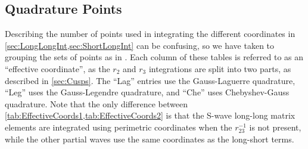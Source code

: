 \documentclass[Dissertation.tex]{subfiles}
\begin{document}
%
%
%


\subsection{Quadrature Points}
\label{sec:QuadraturePoints}


Describing the number of points used in integrating the different coordinates 
in \cref{sec:LongLongInt,sec:ShortLongInt} can be confusing, so we have taken 
to grouping the sets of points as in
. Each column of these tables 
is referred to as an ``effective coordinate'', as the $r_2$ and $r_3$ 
integrations are split into two parts, as described in \cref{sec:Cusps}.
The ``Lag'' entries use the Gauss-Laguerre quadrature, ``Leg'' uses the
Gauss-Legendre quadrature, and ``Che'' uses Chebyshev-Gauss quadrature. Note
that the only difference between \cref{tab:EffectiveCoords1,tab:EffectiveCoords2}
is that the S-wave long-long matrix elements are integrated using perimetric
coordinates when the $r_{23}^{-1}$ is not present, while the other partial
waves use the same coordinates as the long-short terms.
\end{document}
